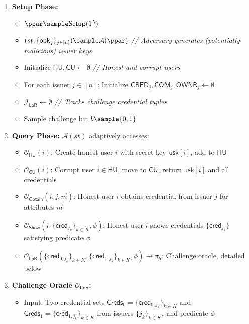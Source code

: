 \begin{enumerate}
    \item \textbf{Setup Phase:}
    \begin{itemize}
        \item $\ppar \sample \mathsf{Setup}(1^\lambda)$
        \item $(st, \{\mathsf{opk}_j\}_{j \in [n]}) \sample \mathcal{A}(\ppar)$ \quad \emph{// Adversary generates (potentially malicious) issuer keys}
        \item Initialize $\mathsf{HU}, \mathsf{CU} \gets \emptyset$ \quad \emph{// Honest and corrupt users}
        \item For each issuer $j \in [n]$: Initialize $\mathsf{CRED}_j, \mathsf{COM}_j, \mathsf{OWNR}_j \gets \emptyset$
        \item $\mathcal{J}_{\mathsf{LoR}} \gets \emptyset$ \quad \emph{// Tracks challenge credential tuples}
        \item Sample challenge bit $b \sample \{0,1\}$
    \end{itemize}

    \item \textbf{Query Phase:} $\mathcal{A}(st)$ adaptively accesses:
    \begin{itemize}
        \item $\mathcal{O}_{\mathsf{HU}}(i)$: Create honest user $i$ with secret key $\mathsf{usk}[i]$, add to $\mathsf{HU}$
        
        \item $\mathcal{O}_{\mathsf{CU}}(i)$: Corrupt user $i \in \mathsf{HU}$, move to $\mathsf{CU}$, return $\mathsf{usk}[i]$ and all credentials 
        
        \item $\mathcal{O}_{\mathsf{Obtain}}(i, j, \vec{m})$: Honest user $i$ obtains credential from issuer $j$ for attributes $\vec{m}$
        
        \item $\mathcal{O}_{\mathsf{Show}}(i, \{\mathsf{cred}_{j_k}\}_{k \in K}, \phi)$: Honest user $i$ shows credentials $\{\mathsf{cred}_{j_k}\}$ satisfying predicate $\phi$
        
        \item $\mathcal{O}_{\mathsf{LoR}}(\{\mathsf{cred}_{0,j_k}\}_{k \in K}, \{\mathsf{cred}_{1,j_k}\}_{k \in K}, \phi) \rightarrow \pi_b$: Challenge oracle, detailed below
    \end{itemize}

    \item \textbf{Challenge Oracle $\mathcal{O}_{\mathsf{LoR}}$:}
    \begin{itemize}
        \item Input: Two credential sets $\mathsf{Creds}_0 = \{\mathsf{cred}_{0,j_k}\}_{k \in K}$ and $\mathsf{Creds}_1 = \{\mathsf{cred}_{1,j_k}\}_{k \in K}$ from issuers $\{j_k\}_{k \in K}$, and predicate $\phi$
        

\end{itemize}
\end{enumerate}
